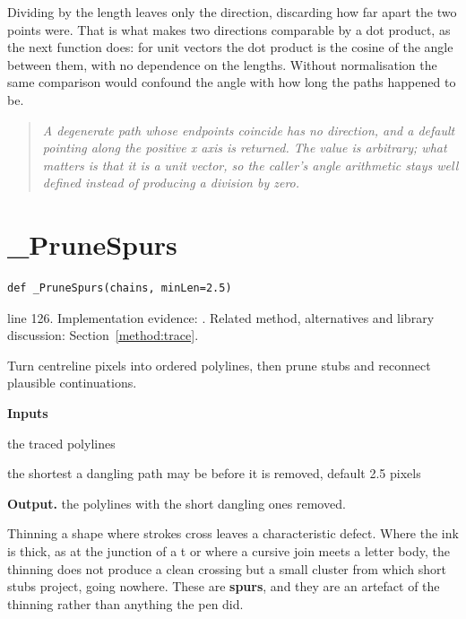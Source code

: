 Dividing by the length leaves only the direction, discarding how far apart the two points were. That is what makes two directions comparable by a dot product, as the next function does: for unit vectors the dot product is the cosine of the angle between them, with no dependence on the lengths. Without normalisation the same comparison would confound the angle with how long the paths happened to be.


\begin{quote}\small\itshape A degenerate path whose endpoints coincide has no direction, and a default pointing along the positive x axis is returned. The value is arbitrary; what matters is that it is a unit vector, so the caller's angle arithmetic stays well defined instead of producing a division by zero.\end{quote}


\section{\_PruneSpurs}\label{fn:style:-PruneSpurs}
\begin{lstlisting}[style=sig]
def _PruneSpurs(chains, minLen=2.5)
\end{lstlisting}
 line 126. Implementation evidence: \cite{code2026}. Related method, alternatives and library discussion: Section~\ref{method:trace}.


Turn centreline pixels into ordered polylines, then prune stubs and reconnect plausible continuations.




\noindent\textbf{Inputs}
\begin{description}[leftmargin=2.2em,style=nextline,font=\normalfont\ttfamily]\setlength\itemsep{1pt}
  \item[{chains}] \normalfont the traced polylines
  \item[{minLen}] \normalfont the shortest a dangling path may be before it is removed, default 2.5 pixels
\end{description}

\noindent\textbf{Output.} the polylines with the short dangling ones removed.


Thinning a shape where strokes cross leaves a characteristic defect. Where the ink is thick, as at the junction of a t or where a cursive join meets a letter body, the thinning does not produce a clean crossing but a small cluster from which short stubs project, going nowhere. These are \textbf{spurs}, and they are an artefact of the thinning rather than anything the pen did.

